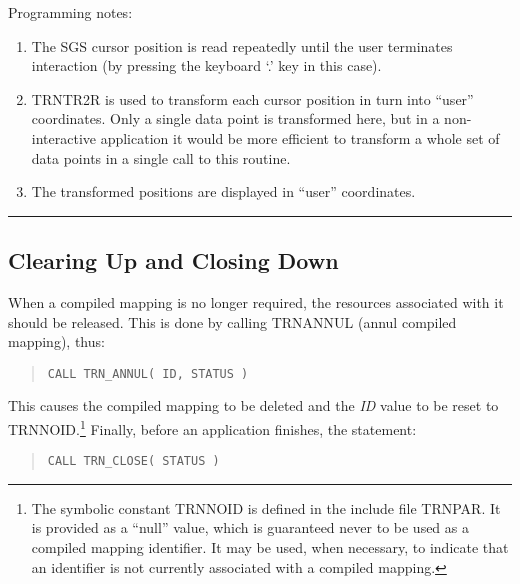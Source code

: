 \documentclass[twoside,11pt]{article}
\newcommand{\xlabel}[1]{}
\renewcommand{\_}{\texttt{\symbol{95}}}
\newcommand{\name}[1]{\mbox{\small{#1}}}
\newcommand{\fortvar}[1]{\mbox{\emph{#1}}}
\newcommand{\exampledone}[0]{\begin{center} \rule{6em}{0.2mm} \end{center}}
\begin{document}
Programming notes:

\begin{enumerate}

\item The \name{SGS} cursor position is read repeatedly until the user
terminates interaction (by pressing the keyboard `.' key in this case).

\item \name{TRN\_TR2R} is used to transform each cursor position in turn
into ``user'' coordinates.
Only a single data point is transformed here, but in a non-interactive
application it would be more efficient to transform a whole set of data
points in a single call to this routine.

\item The transformed positions are displayed in ``user'' coordinates.

\end{enumerate}
\exampledone


\subsection{\xlabel{clearing_up_and_closing_down}Clearing Up and Closing Down}

\label{section:simple:cleanup}

When a compiled mapping is no longer required, the resources associated with
it should be released.
This is done by calling \name{TRN\_ANNUL} (annul compiled mapping), thus:

\begin{quote}
\begin{verbatim}
CALL TRN_ANNUL( ID, STATUS )
\end{verbatim}
\end{quote}

This causes the compiled mapping to be deleted and the \fortvar{ID} value
to be reset to \name{TRN\_\_NOID}.\footnote{
The symbolic constant \name{TRN\_\_NOID} is defined in the include file
\name{TRN\_PAR}.
It is provided as a ``null'' value, which is guaranteed never to be used as
a compiled mapping identifier.
It may be used, when necessary, to indicate that an identifier is not
currently associated with a compiled mapping.}
Finally, before an application finishes, the statement:

\begin{quote}
\begin{verbatim}
CALL TRN_CLOSE( STATUS )
\end{verbatim}
\end{quote}
\end{document}
